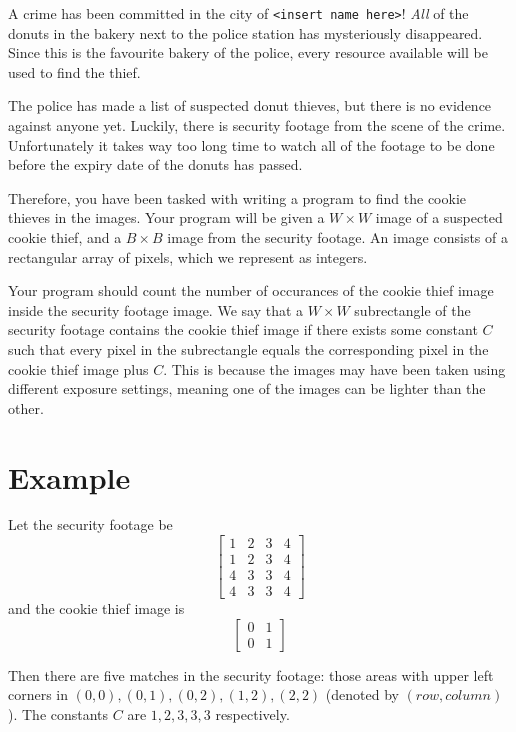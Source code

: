 \newcommand\version{v1}
A crime has been committed in the city of \texttt{<insert name here>}! \emph{All} of the donuts in the bakery next to the police station
has mysteriously disappeared. Since this is the favourite bakery of the police, every resource available will be used to find the thief.

The police has made a list of suspected donut thieves, but there is no evidence against anyone yet.
Luckily, there is security footage from the scene of the crime. Unfortunately it takes way too long time
to watch all of the footage to be done before the expiry date of the donuts has passed.

Therefore, you have been tasked with writing a program to find the cookie thieves in the images.
Your program will be given a $W \times W$ image of a suspected cookie thief, and a $B \times B$
image from the security footage. An image consists of a rectangular array of pixels, which we
represent as integers.

Your program should count the number of occurances of the cookie thief image inside the security footage image.
We say that a $W \times W$ subrectangle of the security footage contains the cookie thief image if there exists
some constant $C$ such that every pixel in the subrectangle equals the corresponding pixel in the cookie thief image
plus $C$. This is because the images may have been taken using different exposure settings, meaning one of the images
can be lighter than the other.


\section*{Example}
Let the security footage be
\[
\begin{bmatrix}
  1 & 2 & 3 & 4 \\
  1 & 2 & 3 & 4 \\
  4 & 3 & 3 & 4 \\
  4 & 3 & 3 & 4
\end{bmatrix}
\]
and the cookie thief image is
\[
\begin{bmatrix}
  0 & 1 \\
  0 & 1
\end{bmatrix}
\]

Then there are five matches in the security footage: those areas with upper left corners in $(0, 0), (0, 1), (0, 2), (1, 2), (2, 2)$ (denoted by $(row, column)$).
The constants $C$ are $1, 2, 3, 3, 3$ respectively.

